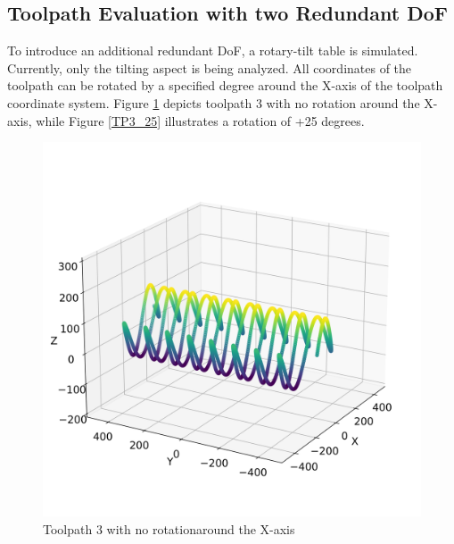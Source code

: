 \newpage

\subsection{Toolpath Evaluation with two Redundant DoF}\label{2RDOF}

To introduce an additional redundant \acrshort{DoF}, a rotary-tilt table is simulated. Currently, only the tilting aspect is being analyzed. All coordinates of the toolpath can be rotated by a specified degree around the X-axis of the toolpath coordinate system. Figure \ref{TP3_0} depicts toolpath 3 with no rotation around the X-axis, while Figure \ref{TP3_25} illustrates a rotation of +25 degrees.

\begin{figure}[H]%
	\centering
	\begin{minipage}{0.5\textwidth}
		\includegraphics[width=\textwidth]{figures/path3_kipp_0.png}
		\caption{Toolpath 3 with no rotation\newline around the X-axis}
		\label{TP3_0}
	\end{minipage}\hfill
	\begin{minipage}{0.5\textwidth}

\end{minipage}
\end{figure}
